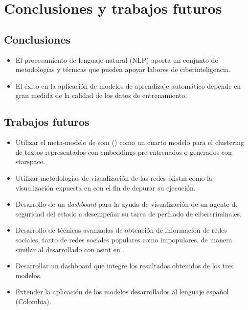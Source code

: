 \chapter{Conclusiones y trabajos futuros}

\label{chap:conclusions}

\section{Conclusiones}
\begin{itemize}
\item El procesamiento de lenguaje natural (NLP) aporta un conjunto de metodologías y técnicas que pueden apoyar labores de ciberinteligencia.

\item El éxito en la aplicación de modelos de aprendizaje automático depende en gran medida de la calidad de los datos de entrenamiento.
\end{itemize}

\section{Trabajos futuros}
\begin{itemize}
\item Utilizar el meta-modelo de \gls{som} () como un cuarto modelo para el clustering de textos representados con embeddings pre-entrenados o generados con \gls{starspace}.
  
\item Utilizar metodologías de visualización de las redes \gls{bilstm} como la visualización expuesta en \cite{madsen2019visualizing} con el fin de depurar su ejecución.
  
\item Desarrollo de un \emph{dashboard} para la ayuda de visualización de un agente de seguridad del estado a desempeñar su tarea de perfilado de cibercriminales.
  
\item Desarrollo de técnicas avanzadas de obtención de información de redes sociales, tanto de redes sociales populares como impopulares, de manera similar al desarrollado con \gls{osint} en \cite{osint}.

\item Desarrollar un dashboard que integre los resultados obtenidos de los tres modelos.

\item Extender la aplicación de los modelos desarrollados al lenguaje español (Colombia).
\end{itemize}
